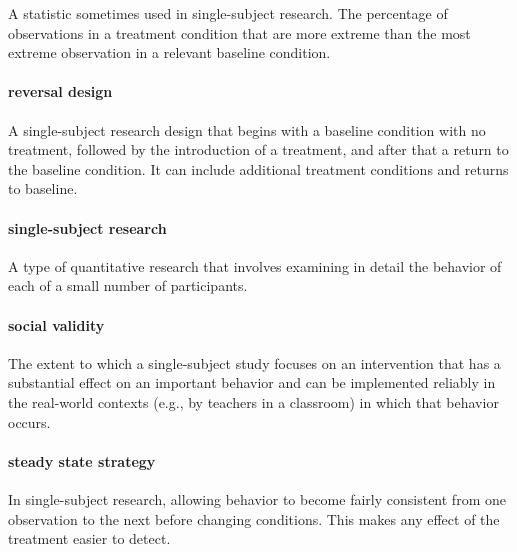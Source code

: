 \documentclass[
]{krantz}
\begin{document}
A statistic sometimes used in single-subject research. The percentage of observations in a treatment condition that are more extreme than the most extreme observation in a relevant baseline condition.

\hypertarget{reversal-design}{%
\paragraph*{reversal design}\label{reversal-design}}

A single-subject research design that begins with a baseline condition with no treatment, followed by the introduction of a treatment, and after that a return to the baseline condition. It can include additional treatment conditions and returns to baseline.

\hypertarget{single-subject-research-1}{%
\paragraph*{single-subject research}\label{single-subject-research-1}}

A type of quantitative research that involves examining in detail the behavior of each of a small number of participants.

\hypertarget{social-validity}{%
\paragraph*{social validity}\label{social-validity}}

The extent to which a single-subject study focuses on an intervention that has a substantial effect on an important behavior and can be implemented reliably in the real-world contexts (e.g., by teachers in a classroom) in which that behavior occurs.

\hypertarget{steady-state-strategy}{%
\paragraph*{steady state strategy}\label{steady-state-strategy}}

In single-subject research, allowing behavior to become fairly consistent from one observation to the next before changing conditions. This makes any effect of the treatment easier to detect.
\end{document}
